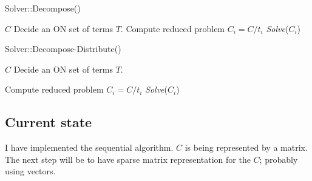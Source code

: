 \begin{algorithm}
\caption{Solver::Decompose()}
\label{decompose}
\begin{algorithmic}
\Require $C$
\State Decide an ON set of terms $T$.
    \State Compute reduced problem $C_i = C/t_i$
        \State \Return \textit{Solve}($C_i$) 
    \EndIf
\EndFor
\end{algorithmic}
\end{algorithm}

\begin{algorithm}
\caption{Solver::Decompose-Distribute()}
\label{dist}
\begin{algorithmic}
\Require $C$
\State Decide an ON set of terms $T$.

 
    \State Compute reduced problem $C_i = C/t_i$
        \State \Return \textit{Solve}($C_i$) 
    \EndIf
\EndFor
\end{algorithmic}
\end{algorithm}

\subsection{Current state}

I have implemented the sequential algorithm. $C$ is being represented by a matrix. The next step will be to have sparse matrix representation for the $C$; probably using vectors.
